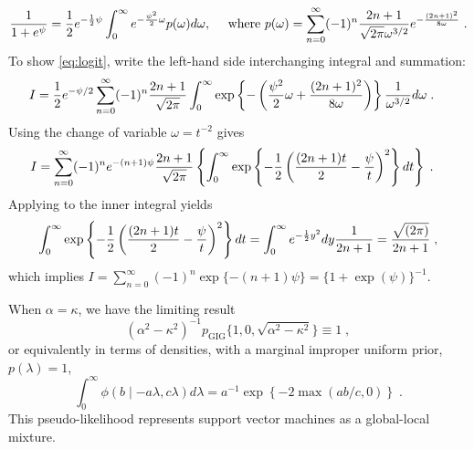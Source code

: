 \documentclass[lineno]{biometrika}
\begin{document}
\begin{equation}
  \frac{1}{1+e^{\psi}} = \half e^{-\half \psi} \int_0^{\infty} 
  e^{-\frac{\psi^2}{2} \omega} p(\omega) d\omega,
  \quad \text{ where } 
  p(\omega) = \sum_{n=0}^{\infty} (-1)^n \frac{2n+1}{\sqrt{2 \pi} \omega^{3/2}} 
  e^{-\frac{(2n+1)^2}{8 \omega}}
  \label{eq:logit}
  \;.
\end{equation}
To show \eqref{eq:logit}, write the left-hand side interchanging integral and summation:
\begin{align*}
  I & = \frac{1}{2} e^{-\psi/2} \sum_{n=0}^{\infty} (-1)^n \frac{2n+1}{\sqrt{2 \pi}} 
  \int_0^{\infty} 
  \exp\left\{-\left(\frac{\psi^2}{2} \omega + \frac{(2n+1)^2}{8 \omega} \right)\right\} 
  \frac{1}{\omega^{3/2}} d\omega
  \;. 
\end{align*}
Using the change of variable $\omega = t^{-2}$ gives
\begin{align*}
  I & = \sum_{n=0}^{\infty} (-1)^n e^{-(n+1)\psi} 
  \frac{2n + 1}{\sqrt{2 \pi}} 
  \left\{ \int_{0}^{\infty} 
    \exp\left\{-\frac{1}{2} \left( \frac{(2n+1)t}{2} - \frac{\psi}{t}\right)^2 \right\} dt 
  \right\}
  \;.
\end{align*}
Applying \CS{} to the inner integral yields 
$$ 
\int_{0}^{\infty} 
\exp\left\{-\frac{1}{2} \left(\frac{(2n+1)t}{2} - \frac{\psi}{t}\right)^2 \right\} dt 
= \int_0^{\infty} e^{-\frac{1}{2} y^2} dy \frac{1}{2n+1} 
\\
= \frac{\sqrt{(2\pi)}}{2n+1}
\;,
$$
which implies 
$I = \sum_{n=0}^{\infty} (-1)^n \exp\{-(n+1) \psi\} = \{1+\exp(\psi)\}^{-1}$. 

\begin{remark}
When $\alpha = \kappa$, we have the limiting result 
$$
(\alpha^2-\kappa^2)^{-1} p_{\mathrm{GIG}}\{1,0, \sqrt{\alpha^2-\kappa^2} \} 
\equiv 1
\;,
$$
or equivalently in terms of densities, with a marginal improper uniform prior, 
$p(\lambda) = 1$,
\begin{equation}
  \int_{0}^{\infty} \phi(b \mid -a\lambda, c\lambda) d\lambda 
  = a^{-1} \exp\left\{-2 \max(ab/c,0)\right\}
  \;. 
  \label{eq:svm}
\end{equation}
This pseudo-likelihood represents support vector machines as a global-local mixture. 
\end{remark}
\end{document}
